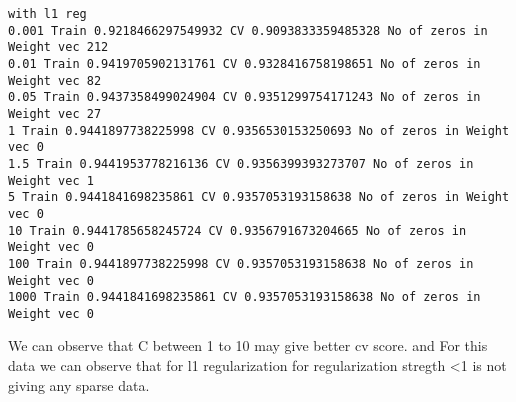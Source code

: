 \documentclass[11pt]{article}
\begin{document}
    \begin{Verbatim}[commandchars=\\\{\}]
with l1 reg
0.001 Train 0.9218466297549932 CV 0.9093833359485328 No of zeros in Weight vec 212
0.01 Train 0.9419705902131761 CV 0.9328416758198651 No of zeros in Weight vec 82
0.05 Train 0.9437358499024904 CV 0.9351299754171243 No of zeros in Weight vec 27
1 Train 0.9441897738225998 CV 0.9356530153250693 No of zeros in Weight vec 0
1.5 Train 0.9441953778216136 CV 0.9356399393273707 No of zeros in Weight vec 1
5 Train 0.9441841698235861 CV 0.9357053193158638 No of zeros in Weight vec 0
10 Train 0.9441785658245724 CV 0.9356791673204665 No of zeros in Weight vec 0
100 Train 0.9441897738225998 CV 0.9357053193158638 No of zeros in Weight vec 0
1000 Train 0.9441841698235861 CV 0.9357053193158638 No of zeros in Weight vec 0

    \end{Verbatim}

    We can observe that C between 1 to 10 may give better cv score. and For
this data we can observe that for l1 regularization for regularization
stregth \textless{}1 is not giving any sparse data.
\end{document}
